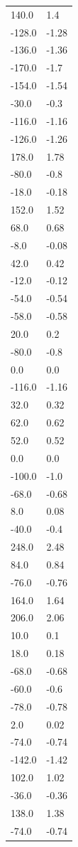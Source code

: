 \begin{longtable}{ll}
140.0 & 1.4 \\
-128.0 & -1.28 \\
-136.0 & -1.36 \\
-170.0 & -1.7 \\
-154.0 & -1.54 \\
-30.0 & -0.3 \\
-116.0 & -1.16 \\
-126.0 & -1.26 \\
178.0 & 1.78 \\
-80.0 & -0.8 \\
-18.0 & -0.18 \\
152.0 & 1.52 \\
68.0 & 0.68 \\
-8.0 & -0.08 \\
42.0 & 0.42 \\
-12.0 & -0.12 \\
-54.0 & -0.54 \\
-58.0 & -0.58 \\
20.0 & 0.2 \\
-80.0 & -0.8 \\
0.0 & 0.0 \\
-116.0 & -1.16 \\
32.0 & 0.32 \\
62.0 & 0.62 \\
52.0 & 0.52 \\
0.0 & 0.0 \\
-100.0 & -1.0 \\
-68.0 & -0.68 \\
8.0 & 0.08 \\
-40.0 & -0.4 \\
248.0 & 2.48 \\
84.0 & 0.84 \\
-76.0 & -0.76 \\
164.0 & 1.64 \\
206.0 & 2.06 \\
10.0 & 0.1 \\
18.0 & 0.18 \\
-68.0 & -0.68 \\
-60.0 & -0.6 \\
-78.0 & -0.78 \\
2.0 & 0.02 \\
-74.0 & -0.74 \\
-142.0 & -1.42 \\
102.0 & 1.02 \\
-36.0 & -0.36 \\
138.0 & 1.38 \\
-74.0 & -0.74 \\

\end{longtable}
